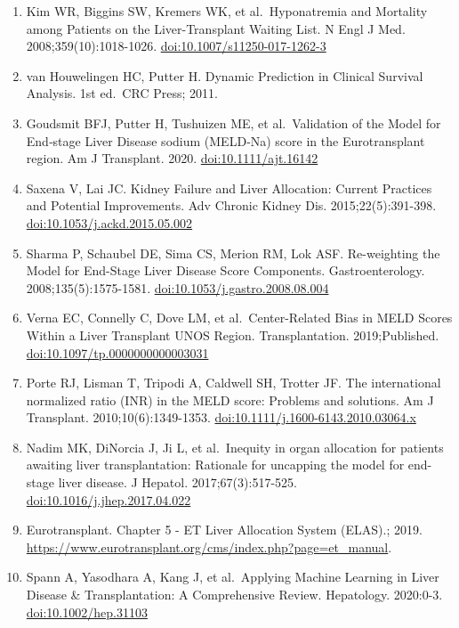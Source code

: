 \documentclass[11pt,english,]{book} %
\begin{document}
\begin{enumerate}
\item
  Kim WR, Biggins SW, Kremers WK, et al.~Hyponatremia and Mortality among Patients on the Liver-Transplant Waiting List. N Engl J Med. 2008;359(10):1018-1026. \url{doi:10.1007/s11250-017-1262-3}
\item
  van Houwelingen HC, Putter H. Dynamic Prediction in Clinical Survival Analysis. 1st ed.~CRC Press; 2011.
\item
  Goudsmit BFJ, Putter H, Tushuizen ME, et al.~Validation of the Model for End‐stage Liver Disease sodium (MELD‐Na) score in the Eurotransplant region. Am J Transplant. 2020. \url{doi:10.1111/ajt.16142}
\item
  Saxena V, Lai JC. Kidney Failure and Liver Allocation: Current Practices and Potential Improvements. Adv Chronic Kidney Dis. 2015;22(5):391-398. \url{doi:10.1053/j.ackd.2015.05.002}
\item
  Sharma P, Schaubel DE, Sima CS, Merion RM, Lok ASF. Re-weighting the Model for End-Stage Liver Disease Score Components. Gastroenterology. 2008;135(5):1575-1581. \url{doi:10.1053/j.gastro.2008.08.004}
\item
  Verna EC, Connelly C, Dove LM, et al.~Center-Related Bias in MELD Scores Within a Liver Transplant UNOS Region. Transplantation. 2019;Published. \url{doi:10.1097/tp.0000000000003031}
\item
  Porte RJ, Lisman T, Tripodi A, Caldwell SH, Trotter JF. The international normalized ratio (INR) in the MELD score: Problems and solutions. Am J Transplant. 2010;10(6):1349-1353. \url{doi:10.1111/j.1600-6143.2010.03064.x}
\item
  Nadim MK, DiNorcia J, Ji L, et al.~Inequity in organ allocation for patients awaiting liver transplantation: Rationale for uncapping the model for end-stage liver disease. J Hepatol. 2017;67(3):517-525. \url{doi:10.1016/j.jhep.2017.04.022}
\item
  Eurotransplant. Chapter 5 - ET Liver Allocation System (ELAS).; 2019. \url{https://www.eurotransplant.org/cms/index.php?page=et_manual}.
\item
  Spann A, Yasodhara A, Kang J, et al.~Applying Machine Learning in Liver Disease \& Transplantation: A Comprehensive Review. Hepatology. 2020:0-3. \url{doi:10.1002/hep.31103}
\end{enumerate}

\newpage
\linespread{1.213}
\normalsize
\thispagestyle{plain}

\mbox{}

\pagecolor{black}
\color{white}
\end{document}
